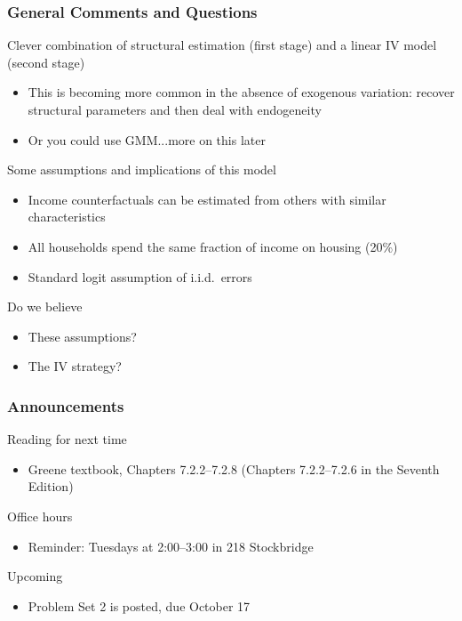 \documentclass{beamer}\usepackage[]{graphicx}\usepackage[]{color}
\begin{document}
\begin{frame}\frametitle{General Comments and Questions}
    Clever combination of structural estimation (first stage) and a linear IV model (second stage)
    \begin{itemize}
      \item This is becoming more common in the absence of exogenous variation: recover structural parameters and then deal with endogeneity
      \item Or you could use GMM...more on this later
    \end{itemize}
    \vspace{2ex}
    Some assumptions and implications of this model
    \begin{itemize}
      \item Income counterfactuals can be estimated from others with similar characteristics
      \item All households spend the same fraction of income on housing (20\%)
      \item Standard logit assumption of i.i.d.\ errors
    \end{itemize}
    \vspace{2ex}
    Do we believe
    \begin{itemize}
      \item These assumptions?
      \item The IV strategy?
    \end{itemize}
\end{frame}

\begin{frame}\frametitle{Announcements}
    Reading for next time
    \begin{itemize}
        \item Greene textbook, Chapters 7.2.2--7.2.8 (Chapters 7.2.2--7.2.6 in the Seventh Edition)
    \end{itemize}
    \vspace{3ex}
    Office hours
    \begin{itemize}
    	\item Reminder: Tuesdays	 at 2:00--3:00 in 218 Stockbridge
    \end{itemize}
    \vspace{3ex}
    Upcoming
    \begin{itemize}
        \item Problem Set 2 is posted, due October 17
    \end{itemize}
\end{frame}
\end{document}

